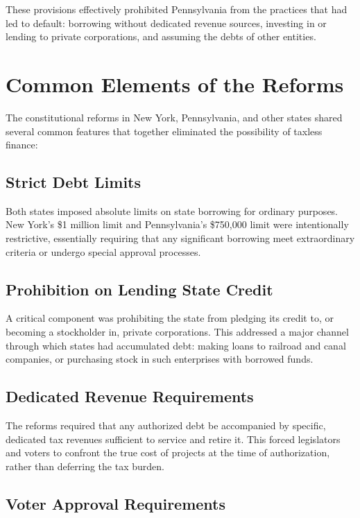 \documentclass[12pt]{article}
\begin{document}
These provisions effectively prohibited Pennsylvania from the practices that had led to default: borrowing without dedicated revenue sources, investing in or lending to private corporations, and assuming the debts of other entities.

\section{Common Elements of the Reforms}

The constitutional reforms in New York, Pennsylvania, and other states shared several common features that together eliminated the possibility of taxless finance:

\subsection{Strict Debt Limits}

Both states imposed absolute limits on state borrowing for ordinary purposes. New York's \$1 million limit and Pennsylvania's \$750,000 limit were intentionally restrictive, essentially requiring that any significant borrowing meet extraordinary criteria or undergo special approval processes.

\subsection{Prohibition on Lending State Credit}

A critical component was prohibiting the state from pledging its credit to, or becoming a stockholder in, private corporations. This addressed a major channel through which states had accumulated debt: making loans to railroad and canal companies, or purchasing stock in such enterprises with borrowed funds.

\subsection{Dedicated Revenue Requirements}

The reforms required that any authorized debt be accompanied by specific, dedicated tax revenues sufficient to service and retire it. This forced legislators and voters to confront the true cost of projects at the time of authorization, rather than deferring the tax burden.

\subsection{Voter Approval Requirements}
\end{document}
